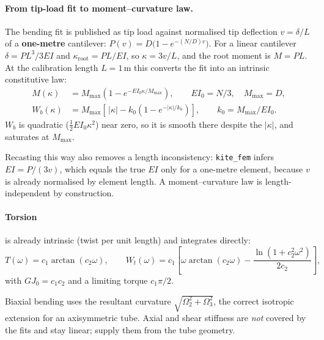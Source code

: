 \documentclass[11pt,a4paper]{article}
\newcommand{\code}[1]{\texttt{\small #1}}
\begin{document}
\paragraph{From tip-load fit to moment--curvature law.}
The bending fit is published as tip load against normalised tip deflection
$v = \delta/L$ of a \textbf{one-metre} cantilever:
$P(v) = D\big(1-e^{-(N/D)v}\big)$. For a linear cantilever
$\delta = PL^3/3EI$ and $\kappa_{\text{root}} = PL/EI$, so $\kappa = 3v/L$, and
the root moment is $M = PL$. At the calibration length $L = 1$\,m this converts
the fit into an intrinsic constitutive law:
\begin{align}
  M(\kappa) &= M_{\max}\left(1 - e^{-EI_0\kappa/M_{\max}}\right),
   \qquad EI_0 = N/3, \quad M_{\max} = D, \label{eq:tubemoment}\\
  W_b(\kappa) &= M_{\max}\left[\,|\kappa| - k_0\left(1 - e^{-|\kappa|/k_0}\right)\right],
   \qquad k_0 = M_{\max}/EI_0 . \label{eq:tubeenergy}
\end{align}
$W_b$ is quadratic ($\tfrac{1}{2}EI_0\kappa^2$) near zero, so it is smooth there
despite the $|\kappa|$, and saturates at $M_{\max}$.

Recasting this way also removes a length inconsistency: \code{kite\_fem} infers
$EI = P/(3v)$, which equals the true $EI$ only for a one-metre element, because
$v$ is already normalised by element length. A moment--curvature law is
length-independent by construction.

\paragraph{Torsion} is already intrinsic (twist per unit length) and integrates
directly:
\begin{equation}
  T(\omega) = c_1\arctan(c_2\omega),
  \qquad
  W_t(\omega) = c_1\!\left[\omega\arctan(c_2\omega)
    - \frac{\ln\!\left(1+c_2^2\omega^2\right)}{2c_2}\right],
\end{equation}
with $GJ_0 = c_1c_2$ and a limiting torque $c_1\pi/2$.

Biaxial bending uses the resultant curvature $\sqrt{\Omega_2^2+\Omega_3^2}$, the
correct isotropic extension for an axisymmetric tube. Axial and shear stiffness
are \emph{not} covered by the fits and stay linear; supply them from the tube
geometry.
\end{document}
